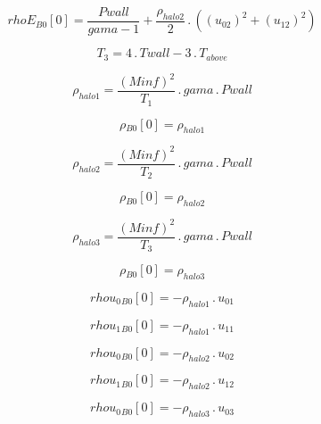 \documentclass{article}
\begin{document}
\begin{dmath}{rhoE{_{B0}}}[{0}] = \frac{Pwall}{gama - 1} + \frac{\rho_{halo 2}}{2} \,.\, \left(\left(u_{02} \right)^{2} + \left(u_{12} \right)^{2}\right)\end{dmath}

\begin{dmath}T_{3} = 4 \,.\, Twall - 3 \,.\, T_{above}\end{dmath}

\begin{dmath}\rho_{halo 1} = \frac{\left(Minf \right)^{2}}{T_{1}} \,.\, gama \,.\, Pwall\end{dmath}

\begin{dmath}{\rho{_{B0}}}[{0}] = \rho_{halo 1}\end{dmath}

\begin{dmath}\rho_{halo 2} = \frac{\left(Minf \right)^{2}}{T_{2}} \,.\, gama \,.\, Pwall\end{dmath}

\begin{dmath}{\rho{_{B0}}}[{0}] = \rho_{halo 2}\end{dmath}

\begin{dmath}\rho_{halo 3} = \frac{\left(Minf \right)^{2}}{T_{3}} \,.\, gama \,.\, Pwall\end{dmath}

\begin{dmath}{\rho{_{B0}}}[{0}] = \rho_{halo 3}\end{dmath}

\begin{dmath}{rhou_{0}{_{B0}}}[{0}] = - \rho_{halo 1} \,.\, u_{01}\end{dmath}

\begin{dmath}{rhou_{1}{_{B0}}}[{0}] = - \rho_{halo 1} \,.\, u_{11}\end{dmath}

\begin{dmath}{rhou_{0}{_{B0}}}[{0}] = - \rho_{halo 2} \,.\, u_{02}\end{dmath}

\begin{dmath}{rhou_{1}{_{B0}}}[{0}] = - \rho_{halo 2} \,.\, u_{12}\end{dmath}

\begin{dmath}{rhou_{0}{_{B0}}}[{0}] = - \rho_{halo 3} \,.\, u_{03}\end{dmath}
\end{document}
